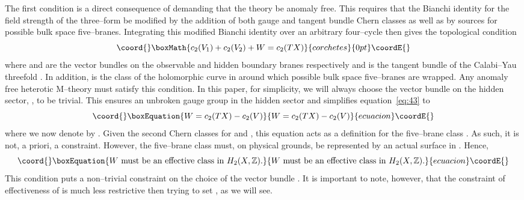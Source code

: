 \documentclass[a4paper,12pt]{article}
\numberwithin{equation}{section}
\theoremstyle{plain}
\begin{document}
The first condition is a direct consequence of demanding that the theory be
anomaly free. This requires that the Bianchi identity for the field strength
of the three--form be modified by the addition of both gauge and tangent
bundle Chern classes as well as by sources for possible bulk space
five--branes. Integrating this modified Bianchi identity over an
arbitrary four--cycle then gives the topological condition
\[\coord{}\boxMath{
c_{2}(V_{1})+c_{2}(V_{2})+W=c_{2}(TX)
}{corchetes}{0pt}\coordE{}\]
where \coordHE{} and \coordHE{} are the vector bundles on the observable and hidden
boundary branes respectively and \coordHE{} is the tangent bundle of the Calabi--Yau
threefold \coordHE{}. In addition, \coordHE{} is the class of the holomorphic 
curve in \coordHE{} around which possible bulk space five--branes are
wrapped. Any anomaly 
free heterotic M--theory must satisfy this condition. In this paper, for
simplicity, we will always choose the vector bundle on the hidden sector,
\coordHE{}, to be trivial. This ensures an unbroken \coordHE{} gauge group in the
hidden sector and simplifies equation~\eqref{eq:43} to
\begin{equation}\coord{}\boxEquation{
W=c_{2}(TX)-c_{2}(V)
\label{eq:43}
}{
W=c_{2}(TX)-c_{2}(V)
}{ecuacion}\coordE{}\end{equation}
where we now denote \coordHE{} by \coordHE{}. Given the second Chern classes for 
\coordHE{} and \coordHE{}, this equation acts as a definition for the five--brane class
\coordHE{}. As such, it is not, a priori, a constraint.
However, the five--brane class must, on physical grounds, be represented by an
 actual surface in \coordHE{}. Hence, 
\begin{equation}\coord{}\boxEquation{
W  \text{ must be an effective class in } H_{2}(X, {\mathbb Z}).
\label{eq:44}
}{
W  \text{ must be an effective class in } H_{2}(X, {\mathbb Z}).
}{ecuacion}\coordE{}\end{equation}
This condition puts a non--trivial constraint on the choice of the vector
bundle \coordHE{}. It is important to note, however, that the constraint of
effectiveness of \coordHE{} is much less restrictive then trying to set
\coordHE{}, as we will see.
\end{document}
